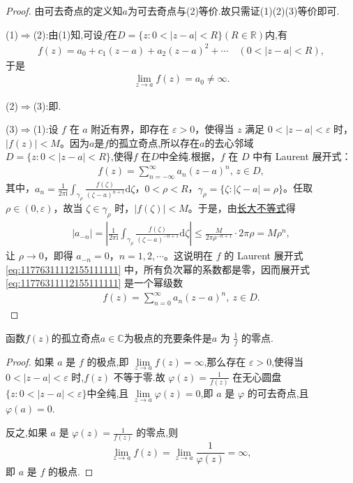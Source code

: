 \documentclass[../../main.tex]{subfiles}%
\begin{document}
\begin{proof}
由可去奇点的定义知$a$为可去奇点与(2)等价.故只需证(1)(2)(3)等价即可.

(1)$\Longrightarrow $(2):由(1)知,可设$f$在$D=\{z:0<|z-a|<R\}(R\in \mathbb{R})$内,有
\begin{align*}
f(z)=a_0+c_1(z-a)+a_2(z-a)^2+\cdots\quad (0<|z-a|<R),
\end{align*}
于是
\begin{align*}
\lim\limits_{z \to a}f(z)=a_0\neq\infty.
\end{align*}

(2)$\Longrightarrow $(3):即.

(3)$\Longrightarrow $(1):设 \( f \) 在 \( a \) 附近有界，即存在 \( \varepsilon > 0 \)，使得当 \( z \) 满足 \( 0 < |z - a| < \varepsilon \) 时，\( |f(z)| < M \)。因为$a$是$f$的孤立奇点,所以存在$a$的去心邻域\( D = \{ z: 0 < |z - a| < R \} \),使得\( f \) 在$D$中全纯.根据，\( f \) 在 \( D \) 中有 Laurent 展开式：
\begin{align}
f(z) = \sum_{n = -\infty}^{\infty} a_n (z - a)^n, \, z \in D, \label{eq:11776311112155111111}
\end{align}
其中，\( a_n = \frac{1}{2\pi \mathrm{i}} \int_{\gamma_{\rho}} \frac{f(\zeta)}{(\zeta - a)^{n + 1}} \mathrm{d}\zeta \)，\( 0 < \rho < R \)，\( \gamma_{\rho} = \{ \zeta: |\zeta - a| = \rho \} \)。任取 \( \rho\in (0,\varepsilon)  \)，故当 \( \zeta \in \gamma_{\rho} \) 时，\( |f(\zeta)| < M \)。于是，由\hyperref[theorem:长大不等式]{长大不等式}得
\begin{align*}
|a_{-n}| = \left| \frac{1}{2\pi \mathrm{i}} \int_{\gamma_{\rho}} \frac{f(\zeta)}{(\zeta - a)^{-n + 1}} \mathrm{d}\zeta \right| \leqslant  \frac{M}{2\pi \rho^{-n + 1}} \cdot 2\pi \rho = M \rho^n,
\end{align*}
让 \( \rho \to 0 \)，即得 \( a_{-n} = 0 \)，\( n = 1, 2, \cdots \)。这说明在 \( f \) 的 Laurent 展开式 \eqref{eq:11776311112155111111} 中，所有负次幂的系数都是零，因而展开式 \eqref{eq:11776311112155111111} 是一个幂级数
\begin{align*}
f(z)=\sum_{n=0}^{\infty}{a_n\left( z-a \right) ^n},\ z\in D.
\end{align*}
\end{proof}

\begin{theorem}\label{theorem:复变函数----定理5.2.2}
函数$f(z)$的孤立奇点$a\in \mathbb{C}$为极点的充要条件是\( a\) 为 \( \frac{1}{f} \) 的零点.
\end{theorem}
\begin{proof}
如果 \( a \) 是 \( f \) 的极点,即 \( \lim\limits_{z \to a} f(z) = \infty \),那么存在 \( \varepsilon > 0 \),使得当 \( 0 < |z - a| < \varepsilon \) 时,\( f(z) \) 不等于零.故 \( \varphi(z) = \frac{1}{f(z)} \) 在无心圆盘$\{z:0<|z-a|<\varepsilon\}$中全纯,且 \( \lim\limits_{z \to a} \varphi(z) = 0 \),即 \( a \) 是 \( \varphi \) 的可去奇点,且 \( \varphi(a) = 0 \).

反之,如果 \( a \) 是 \( \varphi(z) = \frac{1}{f(z)} \) 的零点,则
\[
\lim\limits_{z \to a} f(z) = \lim\limits_{z \to a} \frac{1}{\varphi(z)} = \infty,
\]
即 \( a \) 是 \( f \) 的极点.
\end{proof}
 
\end{document}
